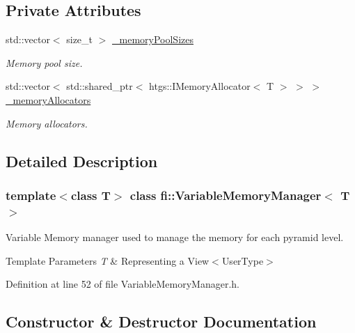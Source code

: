 \subsection*{Private Attributes}
\begin{DoxyCompactItemize}
\item 
std\+::vector$<$ size\+\_\+t $>$ \hyperlink{classfi_1_1VariableMemoryManager_a52671e5b09a6e742cd6fcf1e5014569d}{\+\_\+memory\+Pool\+Sizes}
\begin{DoxyCompactList}\small\item\em Memory pool size. \end{DoxyCompactList}\item 
std\+::vector$<$ std\+::shared\+\_\+ptr$<$ htgs\+::\+I\+Memory\+Allocator$<$ T $>$ $>$ $>$ \hyperlink{classfi_1_1VariableMemoryManager_a408610d37510b46d4f7a81bda0060135}{\+\_\+memory\+Allocators}
\begin{DoxyCompactList}\small\item\em Memory allocators. \end{DoxyCompactList}\end{DoxyCompactItemize}


\subsection{Detailed Description}
\subsubsection*{template$<$class T$>$\newline
class fi\+::\+Variable\+Memory\+Manager$<$ T $>$}

Variable Memory manager used to manage the memory for each pyramid level. 


\begin{DoxyTemplParams}{Template Parameters}
{\em T} & Representing a View$<$\+User\+Type$>$ \\
\hline
\end{DoxyTemplParams}


Definition at line 52 of file Variable\+Memory\+Manager.\+h.



\subsection{Constructor \& Destructor Documentation}
\mbox{\label{classfi_1_1VariableMemoryManager_a7df31faaa03ce722f8eedb3e7275a8de}} 
